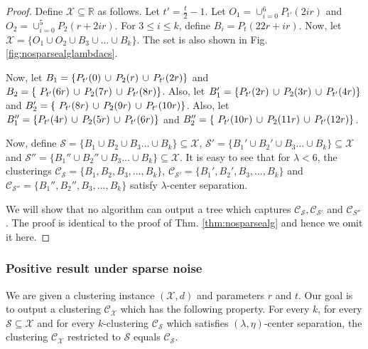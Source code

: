 \documentclass[anon,12pt]{colt2016} %
\newcommand{\mc}{\mathcal}
\begin{document}
\begin{proof}
Define $\mc X \subseteq \mathbb{R}$ as follows. Let $t' = \frac{t}{2}-1$. Let $O_1 = \cup_{i=0}^6 P_{t'}(2ir)$ and $O_2 = \cup_{i=0}^5 P_2(r+2ir)$. For $3\le i\le k$, define $B_i = P_t(22r+ir)$. Now, let $\mc X = \{O_1 \cup O_2 \cup B_3 \cup \ldots \cup B_k\}$. The set is also shown in Fig. \ref{fig:nosparsealglambdacs}.

Now, let $B_1 = \{P_{t'}(0) \thinspace\cup\thinspace  P_{2}(r) \thinspace\cup\thinspace P_{t'}(2r) \}$ and $B_2 = \{\ P_{t'}(6r) \thinspace\cup\thinspace P_{2}(7r)\thinspace\cup\thinspace P_{t'}(8r)\}$. Also, let $B_1' = \{P_{t'}(2r) \thinspace\cup\thinspace  P_{2}(3r) \thinspace\cup\thinspace P_{t'}(4r) \}$ and $B_2' = \{\ P_{t'}(8r) \thinspace\cup\thinspace P_{2}(9r)\thinspace\cup\thinspace P_{t'}(10r)\}$. Also, let $B_1'' = \{P_{t'}(4r) \thinspace\cup\thinspace  P_{2}(5r) \thinspace\cup\thinspace P_{t'}(6r) \}$ and $B_2'' = \{\ P_{t'}(10r) \thinspace\cup\thinspace P_{2}(11r)\thinspace\cup\thinspace P_{t'}(12r)\}$. 

Now, define $\mc S = \{B_1 \cup B_2 \cup B_3\ldots \cup B_k\} \subseteq \mc X$, $\mc S' = \{B_1' \cup B_2' \cup B_3\ldots \cup B_k\} \subseteq \mc X$ and $\mc S'' = \{B_1'' \cup B_2'' \cup B_3\ldots \cup B_k\} \subseteq \mc X$. It is easy to see that for $\lambda < 6$, the clusterings $\mc C_{\mc S} = \{B_1, B_2, B_3, \ldots, B_k\}$, $\mc C_{\mc S'} = \{B_1', B_2', B_3, \ldots, B_k\}$ and $\mc C_{\mc S''} = \{B_1'', B_2'', B_3, \ldots, B_k\}$ satisfy $\lambda$-center separation.

We will show that no algorithm can output a tree which captures $\mc C_{\mc S}, \mc C_{\mc S'}$ and $\mc C_{S''}$. The proof is identical to the proof of Thm. \ref{thm:nosparsealg} and hence we omit it here.
\end{proof}


\subsubsection{Positive result under sparse noise}
\label{section:lambdaPositiveResultSparseNoise}
We are given a clustering instance $(\mc X, d)$ and parameters $r$ and $t$. Our goal is to output a clustering $\mc C_{\mc X}$ which has the following property. For every $k$, for every $\mc S \subseteq \mc X$ and for every $k$-clustering $\mc C_{\mc S}$ which satisfies $(\lambda, \eta)$-center separation, the clustering $\mc C_{\mc X}$ restricted to $\mc S$ equals $\mc C_{\mc S}$. 
\end{document}

